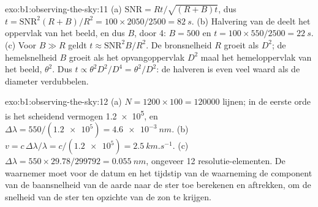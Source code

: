 \begin{solution}{exo:b1:observing-the-sky:11}
(a) $\mathrm{SNR} = Rt/\sqrt{(R + B)t}$, dus $t = \mathrm{SNR}^2(R + B)/R^2
= 100\times2050/2500 = \qty{82}{s}$. (b) Halvering van de  deelt het oppervlak van het beeld,
en dus $B$, door 4: $B = 500$ en $t = 100\times550/2500 =
\qty{22}{s}$. (c) Voor $B \gg R$ geldt
$t \approx \mathrm{SNR}^2B/R^2$. De bronsnelheid $R$ groeit als $D^2$; de hemelsnelheid $B$ groeit
als het opvangoppervlak $D^2$ maal het hemeloppervlak van het beeld, $\theta^2$. Dus
$t \propto
\theta^2D^2/D^4 = \theta^2/D^2$: de  halveren is even veel waard als de
diameter verdubbelen.
\end{solution}

\begin{solution}{exo:b1:observing-the-sky:12}
(a) $N = 1200\times100 = \num{120000}$ lijnen; in de eerste orde is het scheidend vermogen
\num{1.2e5}, en $\Delta\lambda = 550/(\num{1.2e5}) =
\qty{4.6e-3}{nm}$. (b) $v = c\,\Delta\lambda/\lambda = c/(\num{1.2e5}) =
\qty{2.5}{km.s^{-1}}$. (c) $\Delta\lambda = 550\times29.78/\num{299792} =
\qty{0.055}{nm}$, ongeveer 12 resolutie-elementen. De waarnemer moet voor de datum en het
tijdstip van de waarneming de component van de baansnelheid van de aarde naar de ster toe
berekenen en aftrekken, om de snelheid van de ster ten opzichte van de zon te krijgen.
\end{solution}

